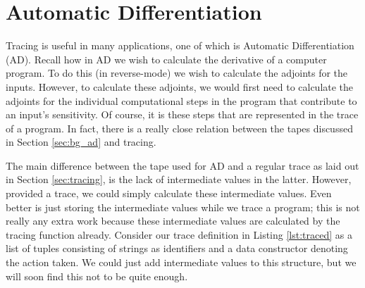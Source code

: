 \clearpage
\section{Automatic Differentiation} \label{sec:ad}
    Tracing is useful in many applications, one of which is Automatic Differentiation (AD).
    Recall how in AD we wish to calculate the derivative of a computer program.
    To do this (in reverse-mode) we wish to calculate the adjoints for the inputs.
    However, to calculate these adjoints, we would first need to calculate the adjoints for the individual computational steps in the program that contribute to an input's sensitivity.
    Of course, it is these steps that are represented in the trace of a program.
    In fact, there is a really close relation between the tapes discussed in Section \ref{sec:bg_ad} and tracing.

    The main difference between the tape used for AD and a regular trace as laid out in Section \ref{sec:tracing}, is the lack of intermediate values in the latter.
    However, provided a trace, we could simply calculate these intermediate values.
    Even better is just storing the intermediate values while we trace a program; this is not really any extra work because these intermediate values are calculated by the tracing function already.
    Consider our trace definition in Listing \ref{lst:traced} as a list of tuples consisting of strings as identifiers and a data constructor denoting the action taken.
    We could just add intermediate values to this structure, but we will soon find this not to be quite enough.
    
